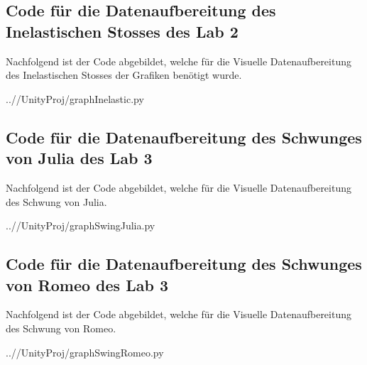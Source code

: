 \documentclass[../main.tex]{subfiles}
\begin{document}
    \subsection{Code für die Datenaufbereitung des Inelastischen Stosses des Lab 2}
    Nachfolgend ist der Code abgebildet, welche für die Visuelle Datenaufbereitung des Inelastischen Stosses
    der Grafiken benötigt wurde.
    \begin{lstinputlisting}[label={lst:graphInelastic}]
        {..//UnityProj/graphInelastic.py}
    \end{lstinputlisting}

    \subsection{Code für die Datenaufbereitung des Schwunges von Julia des Lab 3}
    Nachfolgend ist der Code abgebildet, welche für die Visuelle Datenaufbereitung des Schwung von Julia.
    \begin{lstinputlisting}[label={lst:graphSwingJulia}]
    {..//UnityProj/graphSwingJulia.py}
    \end{lstinputlisting}

    \subsection{Code für die Datenaufbereitung des Schwunges von Romeo des Lab 3}
    Nachfolgend ist der Code abgebildet, welche für die Visuelle Datenaufbereitung des Schwung von Romeo.
    \begin{lstinputlisting}[label={lst:graphSwingRomeo}]
    {..//UnityProj/graphSwingRomeo.py}
    \end{lstinputlisting}
\end{document}
